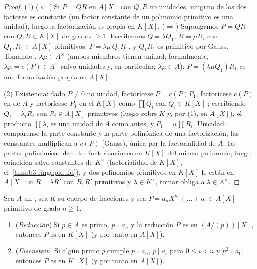 \begin{proof}
(1) ($\Leftarrow$) Si $P = QR$ en $A[X]$ con $Q, R$ no unidades, ninguno
de los dos factores es constante (un factor constante de un polinomio
primitivo es una unidad), luego la factorización es propia en $K[X]$.
($\Rightarrow$) Supongamos $P = QR$ con $Q, R \in K[X]$ de grados
$\geq 1$. Escribamos $Q = \lambda Q_1$, $R = \mu R_1$ con $Q_1, R_1
\in A[X]$ primitivos: $P = \lambda\mu\, Q_1R_1$, y $Q_1R_1$ es primitivo
por Gauss. Tomando ,
$\lambda\mu \in A^\times$ (ambos miembros tienen
 unidad; formalmente,
$\lambda\mu = c(P) \in
A^\times$ salvo unidades y, en particular, $\lambda \mu \in A$): $P
= (\lambda\mu Q_1) R_1$ es una factorización propia en $A[X]$.

(2) Existencia: dado $P \neq 0$ no unidad, factorícese $P = c(P)P_1$,
factorícese $c(P)$ en 
de $A$ y factorícese $P_1$ en el 
$K[X]$ como $\prod Q_i$ con $Q_i \in K[X]$
; escribiendo
$Q_i = \lambda_i R_i$ con $R_i \in A[X]$ primitivos (luego
 sobre $K$ y, por (1),
en $A[X]$), el producto $\prod \lambda_i$ es una unidad de $A$ como
antes, y $P_1 = u\prod
R_i$. Unicidad: compárense la parte constante y la parte polinómica de
una factorización; las constantes multiplican a $c(P)$ (Gauss), única
por la factorialidad de $A$; las partes polinómicas dan dos
factorizaciones en $K[X]$ del mismo polinomio, luego coinciden salvo
constantes de $K^\times$ (factorialidad de $K[X]$,
el~\cref{thm:b3:rings:pidufd}), y dos polinomios primitivos  en
$K[X]$ lo están en $A[X]$: si $R = \lambda R'$ con $R, R'$ primitivos y
$\lambda \in K^\times$, tomar 
obliga a $\lambda \in A^\times$.
\end{proof}

\begin{theorem}\label{thm:b3:rings:criteria}
Sea $A$ un , sea $K$ su cuerpo de
fracciones y sea $P = a_nX^n + \dots
+ a_0 \in A[X]$ primitivo de grado $n \geq 1$.
\begin{enumerate}
  \item (\emph{Reducción}) Si $p \in A$ es primo, $p \nmid a_n$ y la
  reducción $\bar P$ es 
  en $(A/(p))[X]$, entonces $P$ es
   en $K[X]$ (y por tanto
  en
        $A[X]$).
  \item (\emph{Eisenstein}) Si algún primo
  $p$ cumple $p \nmid a_n$, $p \mid a_i$ para $0
        \leq i < n$ y $p^2 \nmid a_0$, entonces $P$ es
   en $K[X]$ (y por tanto
  en $A[X]$).
\end{enumerate}
\end{theorem}

